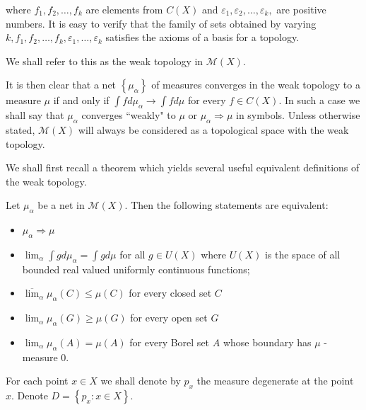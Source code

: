 where \( f _ { 1 } , f _ { 2 } , \ldots , f _ { k } \) are elements from \( C ( X ) \) and \( \varepsilon _ { 1 } , \varepsilon _ { 2 } , \ldots , \varepsilon _ { k } , \) are positive numbers. It is easy to verify that the family of sets obtained by varying \( k , f _ { 1 } , f _ { 2 } , \ldots , f _ { k } , \varepsilon _ { 1 } , \ldots , \varepsilon _ { k } \) satisfies the axioms of a basis for a topology.

\begin{defn}
	We shall refer to this as the weak topology  in \( \mathscr { M } ( X ) \).
\end{defn}

It is then clear that a net \( \left\{ \mu _ { \alpha } \right\} \) of measures converges in the weak topology to a measure \( \mu \) if and only if \( \int f d \mu _ { \alpha } \rightarrow \int f d \mu \) for every \( f \in C ( X ) . \) In such a case we shall say that \( \mu _ { \alpha } \) converges ``weakly" to \( \mu \) or \( \mu _ { \alpha } \Rightarrow \mu \) in symbols. Unless otherwise stated, \( \mathscr { M } ( X ) \) will always be considered as a topological space with the weak topology.

We shall first recall a theorem which yields several useful equivalent definitions of the weak topology.

\begin{thm}
	Let \( \mu _ { \alpha } \) be a net in \( \mathscr { M } ( X ) . \) Then the following statements are equivalent:
	\begin{itemize}
		\label{thm:weak_convergence}
		\item \( \mu _ { \alpha } \Rightarrow \mu \)
		\item \( \lim _ { \alpha } \int g d \mu _ { \alpha } = \int g d \mu \) for all \( g \in U ( X ) \) where \( U ( X ) \) is the space of all bounded real valued uniformly continuous functions;
		\item \( \overline { \lim } _ { \alpha } \mu _ { \alpha } ( C ) \leqslant \mu ( C ) \) for every closed set \( C \)
		\item \( \lim _ { \alpha } \mu _ { \alpha } ( G ) \geqslant \mu ( G ) \) for every open set \( G \)
		\item \( \lim _ { \alpha } \mu _ { \alpha } ( A ) = \mu ( A ) \) for every Borel set \( A \) whose boundary has \( \mu \) -measure \( 0 . \)
	\end{itemize}
\end{thm}

For each point \( x \in X \) we shall denote by \( p _ { x } \) the measure degenerate at the point \( x \). Denote \( D = \left\{ p _ { x }: x \in X \right\} \).

